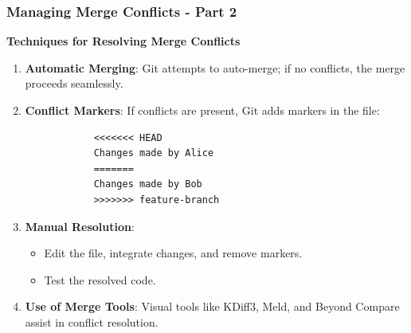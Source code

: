 \documentclass{beamer}
\begin{document}
\begin{frame}[fragile]
    \frametitle{Managing Merge Conflicts - Part 2}

    \textbf{Techniques for Resolving Merge Conflicts}
    \begin{enumerate}
        \item \textbf{Automatic Merging}:
            Git attempts to auto-merge; if no conflicts, the merge proceeds seamlessly.
        
        \item \textbf{Conflict Markers}:
            If conflicts are present, Git adds markers in the file:
            \begin{lstlisting}
            <<<<<<< HEAD
            Changes made by Alice
            =======
            Changes made by Bob
            >>>>>>> feature-branch
            \end{lstlisting}
        
        \item \textbf{Manual Resolution}:
            \begin{itemize}
                \item Edit the file, integrate changes, and remove markers.
                \item Test the resolved code.
            \end{itemize}
        
        \item \textbf{Use of Merge Tools}:
            Visual tools like KDiff3, Meld, and Beyond Compare assist in conflict resolution.
    \end{enumerate}
\end{frame}
\end{document}

